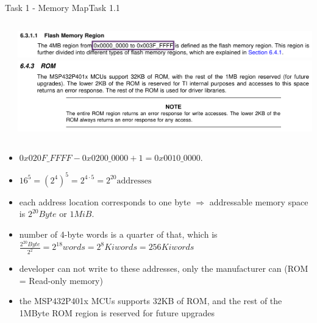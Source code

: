 {\begin{frame}[allowframebreaks]{Task 1 - Memory Map}{Task 1.1\vspace{0.25cm}}
\begin{solution}
\begin{columns}
\begin{column}{0.3\paperwidth}
      \end{column}
      \begin{column}{0.7\paperwidth}
        \includegraphics[height=0.095\paperheight]{./figures/rom2.png}
        \includegraphics[height=0.25\paperheight]{./figures/rom3.png}
      \end{column}
    \end{columns}
    \begin{itemize}
      \item $0x020F\_FFFF - 0x0200\_0000 + 1 = 0x0010\_0000$.
      \item $16^5 = {(2^4)}^5 = 2^{4\cdot 5} = 2^{20} \text{addresses}$
    \end{itemize}
  \end{solution}
  \begin{solution}
    \begin{itemize}
      \item each address location corresponds to \alert{one byte} $\Rightarrow$ \alert{addressable memory space} is $2^{20} Byte$ or $1 MiB$.
      \item number of 4-byte words is a \alert{quarter} of that, which is $\frac{2^{20} Byte}{2^2} = 2^{18} words = 2^8 Kiwords= 256 Kiwords$
    \end{itemize}
  \end{solution}
  \begin{Sidenote}
    \begin{itemize}
      \item developer can not write to these addresses, only the manufacturer can (ROM = \alert{R}ead-\alert{o}nly \alert{m}emory)
      \item the MSP432P401x MCUs supports 32KB of ROM, and the rest of the 1MByte ROM region is reserved for \alert{future upgrades}
    \end{itemize}
  \end{Sidenote}
\end{frame}
}\fi

